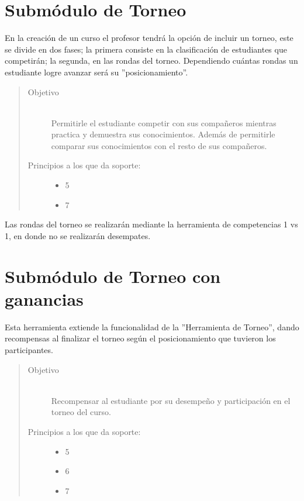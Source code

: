 \clearpage

\section{Submódulo de Torneo}

    En la creación de un curso el profesor tendrá la opción de incluir un torneo, este se divide en dos fases; la primera consiste en la clasificación de estudiantes que competirán; la segunda, en las rondas del torneo. Dependiendo cuántas rondas un estudiante logre avanzar será su ''posicionamiento''.

    \begin{quote}
    \begin{description}
    \item[Objetivo] \hfill\\
        Permitirle el estudiante competir con sus compañeros mientras practica y demuestra sus conocimientos. Además de permitirle comparar sus conocimientos con el resto de sus compañeros.

    \item[Principios a los que da soporte:] \hfill
        \begin{itemize}
            \item 5 \principioV
            \item 7 \principioVII
        \end{itemize}
    \end{description}
    \end{quote}

    \noindent Las rondas del torneo se realizarán mediante la herramienta de competencias 1 vs 1, en donde no se realizarán desempates.

\section{Submódulo de Torneo con ganancias}

    Esta herramienta extiende la funcionalidad de la ''Herramienta de Torneo'', dando recompensas al finalizar el torneo según el posicionamiento que tuvieron los participantes.

    \begin{quote}
    \begin{description}
    \item[Objetivo] \hfill\\
        Recompensar al estudiante por su desempeño y participación en el torneo del curso.
    \item[Principios a los que da soporte:] \hfill
        \begin{itemize}
            \item 5 \principioV
            \item 6 \principioVI
            \item 7 \principioVII
        \end{itemize}
    \end{description}
    \end{quote}

